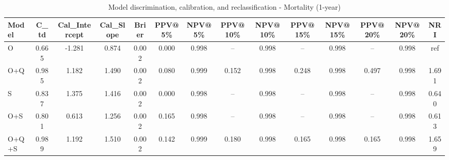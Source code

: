 \begin{table}[htbp]
\centering
\small
\caption{Model discrimination, calibration, and reclassification - Mortality (1-year)}
\label{tab:perf_mortality_1y}
\begin{tabular}{lccccccccccccc}
\toprule
Model & C\_td & Cal\_Intercept & Cal\_Slope & Brier & PPV@5\% & NPV@5\% & PPV@10\% & NPV@10\% & PPV@15\% & NPV@15\% & PPV@20\% & NPV@20\% & NRI \\
\midrule
O & 0.665 & -1.281 & 0.874 & 0.002 & 0.000 & 0.998 & -- & 0.998 & -- & 0.998 & -- & 0.998 & ref \\
O+Q & 0.985 & 1.182 & 1.490 & 0.002 & 0.080 & 0.999 & 0.152 & 0.998 & 0.248 & 0.998 & 0.497 & 0.998 & 1.691 \\
S & 0.837 & 1.375 & 1.416 & 0.002 & 0.000 & 0.998 & -- & 0.998 & -- & 0.998 & -- & 0.998 & 0.640 \\
O+S & 0.801 & 0.613 & 1.256 & 0.002 & 0.165 & 0.998 & -- & 0.998 & -- & 0.998 & -- & 0.998 & 0.613 \\
O+Q+S & 0.989 & 1.192 & 1.510 & 0.002 & 0.142 & 0.999 & 0.180 & 0.998 & 0.165 & 0.998 & 0.165 & 0.998 & 1.659 \\
\bottomrule
\end{tabular}
\end{table}